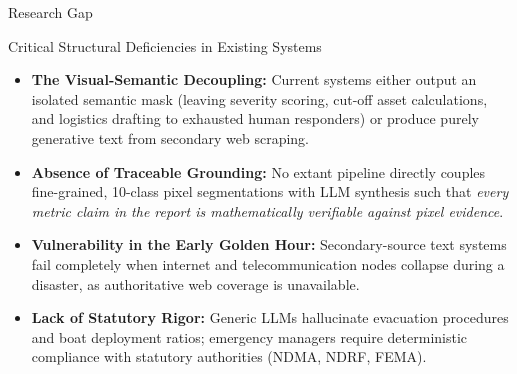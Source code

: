 \documentclass[aspectratio=169, 10pt, professionalfonts]{beamer}
\begin{document}
\begin{frame}{Research Gap}
  \begin{block}{Critical Structural Deficiencies in Existing Systems}
    \begin{itemize}\setlength{\itemsep}{0.7em}
      \item \textbf{The Visual-Semantic Decoupling:} Current systems either output an isolated semantic mask (leaving severity scoring, cut-off asset calculations, and logistics drafting to exhausted human responders) or produce purely generative text from secondary web scraping.
      \item \textbf{Absence of Traceable Grounding:} No extant pipeline directly couples fine-grained, 10-class pixel segmentations with LLM synthesis such that \textit{every metric claim in the report is mathematically verifiable against pixel evidence}.
      \item \textbf{Vulnerability in the Early Golden Hour:} Secondary-source text systems fail completely when internet and telecommunication nodes collapse during a disaster, as authoritative web coverage is unavailable.
      \item \textbf{Lack of Statutory Rigor:} Generic LLMs hallucinate evacuation procedures and boat deployment ratios; emergency managers require deterministic compliance with statutory authorities (NDMA, NDRF, FEMA).
    \end{itemize}
  \end{block}
\end{frame}
\end{document}
